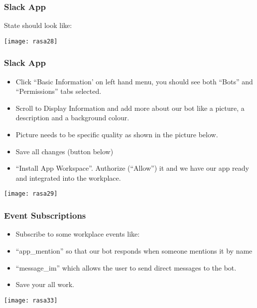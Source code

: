 \begin{frame}[fragile]\frametitle{Slack App}
State should look like:
\begin{center}
\texttt{[image: rasa28]}
\end{center}
\end{frame}

\begin{frame}[fragile]\frametitle{Slack App}
\begin{itemize}
\item Click ``Basic Information' on left hand menu, you should see both ``Bots'' and ``Permissions'' tabs selected.
\item Scroll to Display Information and add more about our bot like a picture, a description and a background colour.
\item Picture needs to be specific quality as shown in the picture below.
\item Save all changes (button below)
\item ``Install App Workspace''. Authorize (``Allow'') it and we have our app ready and integrated into the workplace.
\end{itemize}

\begin{center}
\texttt{[image: rasa29]}
\end{center}
\end{frame}

\begin{frame}[fragile]\frametitle{Event Subscriptions}
\begin{itemize}
\item Subscribe to some workplace events like:
\item ``app\_mention'' so that our bot responds when someone mentions it by name
\item ``message\_im'' which allows the user to send direct messages to the bot.
\item Save your all work.
\end{itemize}

\begin{center}
\texttt{[image: rasa33]}
\end{center}
\end{frame}




